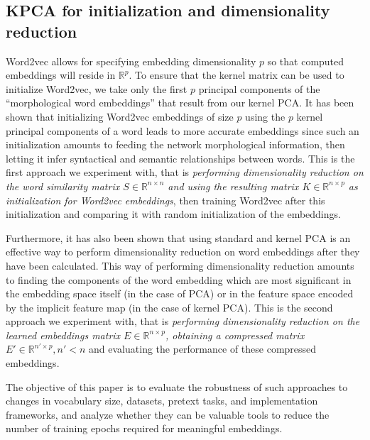 \subsection{KPCA for initialization and dimensionality reduction}

Word2vec allows for specifying embedding dimensionality $p$ so that computed embeddings will reside in $\mathbb{R}^p$.
To ensure that the kernel matrix can be used to initialize Word2vec, we take only the first $p$ principal components of the ``morphological word embeddings'' that result from our kernel PCA.
It has been shown \cite{gupta_improving_2019} that initializing Word2vec embeddings of size $p$ using the $p$ kernel principal components of a word leads to more accurate embeddings since such an initialization amounts to feeding the network morphological information, then letting it infer syntactical and semantic relationships between words.
This is the first approach we experiment with, that is \emph{performing dimensionality reduction on the word similarity matrix $S \in \mathbb{R}^{n\times n}$ and using the resulting matrix $K \in \mathbb{R}^{n \times p}$ as initialization for Word2vec embeddings}, then training Word2vec after this initialization and comparing it with random initialization of the embeddings.

Furthermore, it has also been shown \cite{raunak_simple_2017} that using standard and kernel PCA is an effective way to perform dimensionality reduction on word embeddings after they have been calculated.
This way of performing dimensionality reduction amounts to finding the components of the word embedding which are most significant in the embedding space itself (in the case of PCA) or in the feature space encoded by the implicit feature map (in the case of kernel PCA).
This is the second approach we experiment with, that is \emph{performing dimensionality reduction on the learned embeddings matrix $E \in \mathbb{R}^{n \times p}$, obtaining a compressed matrix $E' \in \mathbb{R}^{n' \times p}, n' < n$} and evaluating the performance of these compressed embeddings.

The objective of this paper is to evaluate the robustness of such approaches to changes in vocabulary size, datasets, pretext tasks, and implementation frameworks, and analyze whether they can be valuable tools to reduce the number of training epochs required for meaningful embeddings.

